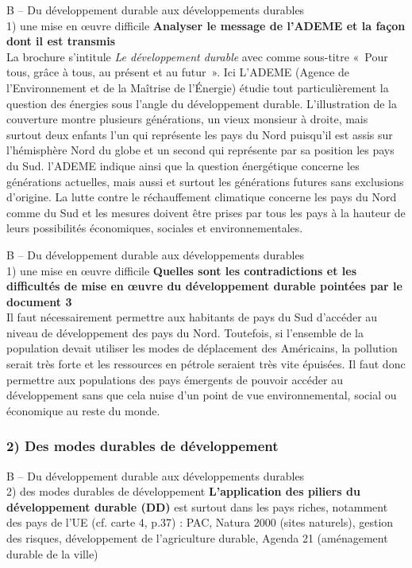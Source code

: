 \documentclass[C]{beamer}
\begin{document}
		\begin{frame}[allowframebreaks]{B -- Du développement durable aux développements durables\\ 1) une mise en œuvre difficile}
		\textbf{Analyser le message de l'ADEME et la façon dont il est transmis}\\
La brochure s'intitule \textit{Le développement durable} avec comme sous-titre  «~Pour tous, grâce à tous, au présent et au futur~». Ici L'ADEME (Agence de l'Environnement et de la Maîtrise de l'\'Energie) étudie tout particulièrement la question des énergies sous l'angle du développement durable. L'illustration de la couverture montre plusieurs générations, un vieux monsieur à droite, mais surtout deux enfants l'un qui représente les pays du Nord puisqu'il est assis sur l'hémisphère Nord du globe et un second qui représente par sa position les pays du Sud. l'ADEME indique ainsi que la question énergétique concerne les générations actuelles, mais aussi et surtout les générations futures sans exclusions d'origine. La lutte contre le réchauffement climatique concerne les pays du Nord comme du Sud et les mesures doivent être prises par tous les pays à la hauteur de leurs possibilités économiques, sociales et environnementales.
		\end{frame}
		
		\begin{frame}{B -- Du développement durable aux développements durables\\ 1) une mise en œuvre difficile}
		\textbf{Quelles sont les contradictions et les difficultés de mise en œuvre du développement durable pointées par le document 3}\\
Il faut nécessairement permettre aux habitants de pays du Sud d'accéder au niveau de développement des pays du Nord. Toutefois, si l'ensemble de la population devait utiliser les modes de déplacement des Américains, la pollution serait très forte et les ressources en pétrole seraient très vite épuisées. Il faut donc permettre aux populations des pays émergents de pouvoir accéder au développement sans que cela nuise d'un point de vue environnemental, social ou économique au reste du monde.
		\end{frame}
		
		\subsubsection*{2) Des modes durables de développement}
		\begin{frame}{B -- Du développement durable aux développements durables\\ 2) des modes durables de développement}
		\textbf{L'application des piliers du développement durable (DD)} est surtout dans les pays riches, notamment des pays de l'UE (cf. carte 4, p.37) : PAC, Natura 2000 (sites naturels), gestion des risques, développement de l'agriculture durable, Agenda 21 (aménagement durable de la ville)
		\end{frame}
		
\end{document}
